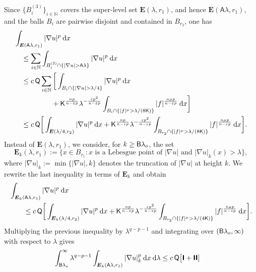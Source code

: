 \documentclass[10pt,letterpaper]{amsart}
\theoremstyle{definition}
\numberwithin{theorem}{section}
\numberwithin{equation}{section}
\newcommand{\N}{\ensuremath{\mathbb{N}}}
\newcommand{\1}{\ensuremath{\mathds{1}}}
\newcommand\sfI{{\boldsymbol{\mathsf I}}}
\renewcommand{\epsilon}{\varepsilon}
\renewcommand{\epsilon}{\varepsilon}
\renewcommand{\d}{\:\! \mathrm{d}}
\numberwithin{equation}{section}
\begin{document}
Since \(\{B_i^{(3)}\}_{i\in \N}\) covers the super-level set \(\boldsymbol E(\lambda,r_1)\), and hence \(\boldsymbol E(\mathsf A \lambda,r_1)\), and the balls \(B_i\) are pairwise disjoint and contained in \(B_{r_2}\), one has
\begin{align*}
    &\int_{\boldsymbol E(\mathsf A \lambda,r_1)} |\nabla u|^p \, \d x \\
    &\quad\le
    \sum_{i\in\N}
    \int_{B_i^{(3)}\cap \left\{ |\nabla u| >\mathsf A \lambda \right\}} |\nabla u|^p \, \d x\\
    &\quad\le
    c\,{\sf Q}
    \sum_{i\in\N}
    \bigg[\int_{B_i \cap \{|\nabla u| > \lambda/4 \}} |\nabla u|^p \, \d x\\
    &\qquad\qquad\quad\;+ 
    \mathsf K^{\frac{n p}{n-\epsilon p}} 
    \lambda^{-\frac{\epsilon p^2}{n-\epsilon p}}
    \int_{B_i \cap \{|f|^\mu > \lambda/(8\mathsf K) \}} |f|^{\frac{n\mu p}{n-\epsilon p}} \, \d x \bigg]\\
    &\quad\leq 
    c\,{\sf Q} \bigg[\int_{\boldsymbol E(\lambda/4,r_2)} |\nabla u|^p \, \d x + 
    \mathsf K^{\frac{n p}{n-\epsilon p}} 
    \lambda^{-\frac{\epsilon p^2}{n-\epsilon p}} 
    \int_{B_{r_2} \cap \{|f|^\mu > \lambda/(8\mathsf K) \}} |f|^{\frac{n\mu p}{n-\epsilon p}} \, \d x \bigg].
\end{align*}
Instead of \(\boldsymbol{E}(\lambda,r_1)\), we consider, for \(k \ge {\sf B} \lambda_o\), the set
\begin{equation*}
    \boldsymbol{E}_k(\lambda,r_1) 
    := 
    \Big\{ x \in B_{r_1} : x \text{ is a Lebesgue point of } |\nabla u| \text{ and } |\nabla u|_k(x) > \lambda \Big\},
\end{equation*}
where \(|\nabla u|_k := \min \{ |\nabla u|, k \}\) denotes the truncation of \(|\nabla u|\) at height \(k\).
 We rewrite the last inequality in terms of $\boldsymbol E_k$ and obtain
\begin{align*}
    &\int_{\boldsymbol E_k(\mathsf A \lambda,r_1)} |\nabla u|^p \, \d x \\
    &\qquad\leq 
    c\, {\sf Q}
    \bigg[\int_{\boldsymbol E_k(\lambda/4,r_2)} |\nabla u|^p \, \d x + 
    \mathsf K^{\frac{n p}{n-\epsilon p}} 
    \lambda^{-\frac{\epsilon p^2}{n-\epsilon p}} 
    \int_{B_{r_2} \cap \{|f|^\mu > \lambda/(4\mathsf K) \}} |f|^{\frac{n\mu p}{n-\epsilon p}} \, \d x \bigg].
\end{align*}
Multiplying the previous inequality by \(\lambda^{q-p-1}\) and integrating over \(({\sf B}\lambda_o, \infty)\) with respect to \(\lambda\) gives
\begin{align*}
\int_{{\sf B}\lambda_o}^\infty\lambda^{q-p-1} 
\int_{\boldsymbol E_k(\mathsf A \lambda,r_1)} |\nabla u|_k^p \, \d x \, \d \lambda
&\le 
c\,{\sf Q}\big[\sfI+\sfI\sfI]
\end{align*}
\end{document}
